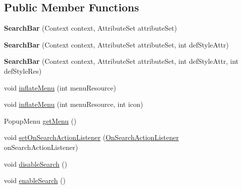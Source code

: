 \subsection*{Public Member Functions}
\begin{DoxyCompactItemize}
\item 
\mbox{\label{classcom_1_1example_1_1searchwidget_1_1_search_bar_abe1b4f1eae5f17d0ead6e93fb0981f9e}} 
{\bfseries Search\+Bar} (Context context, Attribute\+Set attribute\+Set)
\item 
\mbox{\label{classcom_1_1example_1_1searchwidget_1_1_search_bar_a8fc1b79e76688bcf3a85d48576ef12b7}} 
{\bfseries Search\+Bar} (Context context, Attribute\+Set attribute\+Set, int def\+Style\+Attr)
\item 
\mbox{\label{classcom_1_1example_1_1searchwidget_1_1_search_bar_a5da4deb66d6fbb4441e3d27bd82da15d}} 
{\bfseries Search\+Bar} (Context context, Attribute\+Set attribute\+Set, int def\+Style\+Attr, int def\+Style\+Res)
\item 
void \mbox{\hyperlink{classcom_1_1example_1_1searchwidget_1_1_search_bar_a3b4bfd362b0867b487bb2cc354232e3e}{inflate\+Menu}} (int menu\+Resource)
\item 
void \mbox{\hyperlink{classcom_1_1example_1_1searchwidget_1_1_search_bar_a71f7fc6ed5b0797b263734590ef49a16}{inflate\+Menu}} (int menu\+Resource, int icon)
\item 
Popup\+Menu \mbox{\hyperlink{classcom_1_1example_1_1searchwidget_1_1_search_bar_af3e813af6c49f88e24d593dfa41037be}{get\+Menu}} ()
\item 
void \mbox{\hyperlink{classcom_1_1example_1_1searchwidget_1_1_search_bar_a065921f97e1f2d1d3c496a5670482f28}{set\+On\+Search\+Action\+Listener}} (\mbox{\hyperlink{interfacecom_1_1example_1_1searchwidget_1_1_search_bar_1_1_on_search_action_listener}{On\+Search\+Action\+Listener}} on\+Search\+Action\+Listener)
\item 
void \mbox{\hyperlink{classcom_1_1example_1_1searchwidget_1_1_search_bar_a3327b14ae63c960269fa8b3ac7dadfd8}{disable\+Search}} ()
\item 
void \mbox{\hyperlink{classcom_1_1example_1_1searchwidget_1_1_search_bar_a039b132a7be1dda56d6020b07017b277}{enable\+Search}} ()
\item 

\end{DoxyCompactItemize}
